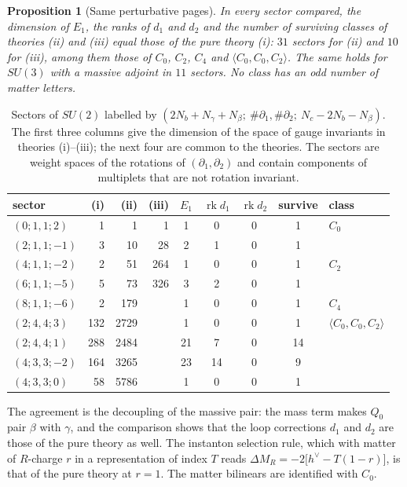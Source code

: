 \documentclass[11pt]{article}
\numberwithin{equation}{section}
\numberwithin{figure}{section}
\numberwithin{table}{section}
\newtheorem{proposition}[theorem]{Proposition}
\theoremstyle{definition}
\begin{document}
\begin{proposition}[Same perturbative pages]\label{prop-pages}
In every sector compared, the dimension of $E_1$, the ranks of $d_1$ and $d_2$ and the number of surviving classes of theories (ii) and (iii) equal those of the pure theory (i): $31$ sectors for (ii) and $10$ for (iii), among them those of $C_0$, $C_2$, $C_4$ and $\langle C_0,C_0,C_2\rangle$. The same holds for $SU(3)$ with a massive adjoint in $11$ sectors. No class has an odd number of matter letters.
\end{proposition}

\begin{table}[H]
\centering
\begin{tabular}{@{}l|rrr|cccc|l@{}}
\toprule
sector & (i) & (ii) & (iii) & $E_1$ & $\operatorname{rk}d_1$ & $\operatorname{rk}d_2$ & survive & class\\
\midrule
$(0;1,1;2)$ & 1 & 1 & 1 & 1 & 0 & 0 & 1 & $C_0$\\
$(2;1,1;-1)$ & 3 & 10 & 28 & 2 & 1 & 0 & 1 & \\
$(4;1,1;-2)$ & 2 & 51 & 264 & 1 & 0 & 0 & 1 & $C_2$\\
$(6;1,1;-5)$ & 5 & 73 & 326 & 3 & 2 & 0 & 1 & \\
$(8;1,1;-6)$ & 2 & 179 & & 1 & 0 & 0 & 1 & $C_4$\\
$(2;4,4;3)$ & 132 & 2729 & & 1 & 0 & 0 & 1 & $\langle C_0,C_0,C_2\rangle$\\
$(2;4,4;1)$ & 288 & 2484 & & 21 & 7 & 0 & 14 & \\
$(4;3,3;-2)$ & 164 & 3265 & & 23 & 14 & 0 & 9 & \\
$(4;3,3;0)$ & 58 & 5786 & & 1 & 0 & 0 & 1 & \\
\bottomrule
\end{tabular}
\caption{Sectors of $SU(2)$ labelled by $(2N_b+N_\gamma+N_\beta;\ \#\partial_1,\#\partial_2;\ N_c-2N_b-N_\beta)$. The first three columns give the dimension of the space of gauge invariants in theories (i)--(iii); the next four are common to the theories. The sectors are weight spaces of the rotations of $(\partial_1,\partial_2)$ and contain components of multiplets that are not rotation invariant.}
\label{tab-pages}
\end{table}

The agreement is the decoupling of the massive pair: the mass term makes $Q_0$ pair $\beta$ with $\gamma$, and the comparison shows that the loop corrections $d_1$ and $d_2$ are those of the pure theory as well. The instanton selection rule, which with matter of $R$-charge $r$ in a representation of index $T$ reads $\Delta M_R=-2\big[h^\vee-T(1-r)\big]$, is that of the pure theory at $r=1$. The matter bilinears are identified with $C_0$.
\end{document}
